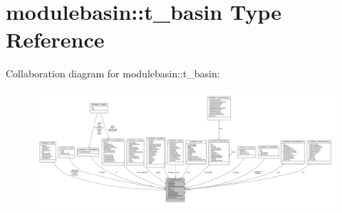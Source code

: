 \hypertarget{structmodulebasin_1_1t__basin}{}\section{modulebasin\+:\+:t\+\_\+basin Type Reference}
\label{structmodulebasin_1_1t__basin}


Collaboration diagram for modulebasin\+:\+:t\+\_\+basin\+:
\nopagebreak
\begin{figure}[H]
\begin{center}
\leavevmode
\includegraphics[width=350pt]{structmodulebasin_1_1t__basin__coll__graph}
\end{center}
\end{figure}
